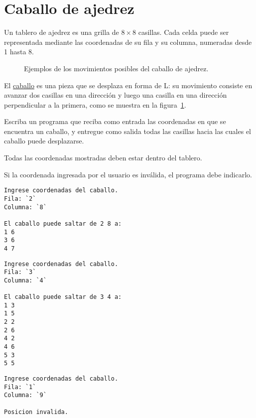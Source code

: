 \section{Caballo de ajedrez}

Un tablero de ajedrez es una grilla de \(8\times 8\) casillas. Cada celda puede
ser representada mediante las coordenadas de su fila y su columna,
numeradas desde 1 hasta 8.

\begin{figure}
  \centering
  
  \caption{Ejemplos de los movimientos posibles del caballo de ajedrez.}
  \label{fig:caballo-ajedrez}
\end{figure}

El \href{http://es.wikipedia.org/wiki/Caballo\_(ajedrez)}{caballo} es
una pieza que se desplaza en forma de L: su movimiento consiste en
avanzar dos casillas en una dirección y luego una casilla en una
dirección perpendicular a la primera,
como se muestra en la figura~\ref{fig:caballo-ajedrez}.

Escriba un programa que reciba como entrada las coordenadas en que se
encuentra un caballo, y entregue como salida todas las casillas hacia
las cuales el caballo puede desplazarse.

Todas las coordenadas mostradas deben estar dentro del tablero.

Si la coordenada ingresada por el usuario es inválida, el programa debe
indicarlo.

\begin{lstlisting}[language=testcase]
Ingrese coordenadas del caballo.
Fila: `2`
Columna: `8`

El caballo puede saltar de 2 8 a:
1 6
3 6
4 7
\end{lstlisting}

\begin{lstlisting}[language=testcase]
Ingrese coordenadas del caballo.
Fila: `3`
Columna: `4`

El caballo puede saltar de 3 4 a:
1 3
1 5
2 2
2 6
4 2
4 6
5 3
5 5
\end{lstlisting}

\begin{lstlisting}[language=testcase]
Ingrese coordenadas del caballo.
Fila: `1`
Columna: `9`

Posicion invalida.
\end{lstlisting}

